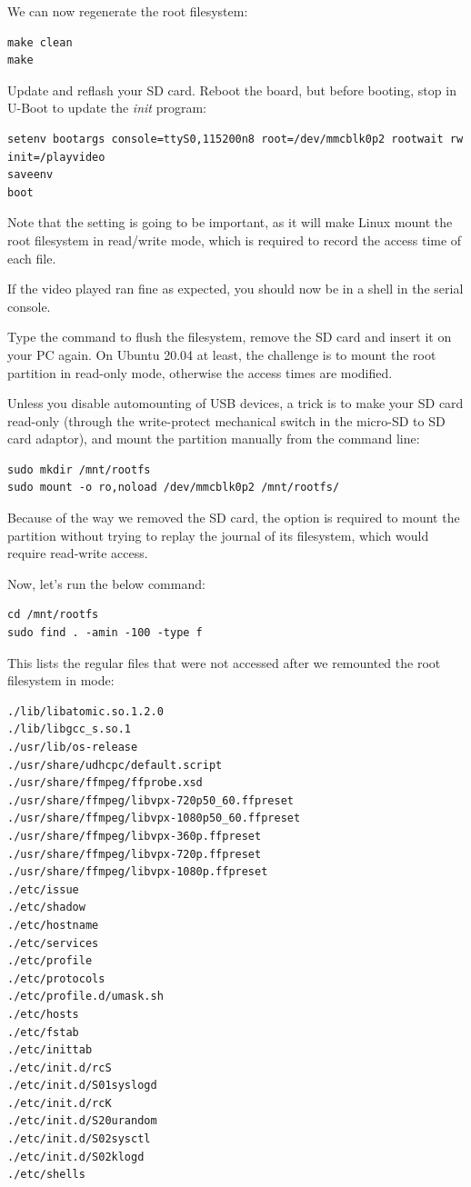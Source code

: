 We can now regenerate the root filesystem:
\begin{verbatim}
make clean
make
\end{verbatim}

Update and reflash your SD card. Reboot the board, but before booting,
stop in U-Boot to update the {\em init} program:

\begin{verbatim}
setenv bootargs console=ttyS0,115200n8 root=/dev/mmcblk0p2 rootwait rw init=/playvideo
saveenv
boot
\end{verbatim}

Note that the  setting is going to be important, as it will
make Linux mount the root filesystem in read/write mode, which is
required to record the access time of each file.

If the video played ran fine as expected, you should now be in a shell
in the serial console.

Type the  command to flush the filesystem, remove the SD card
and insert it on your PC again. On Ubuntu 20.04 at least, the challenge
is to mount the root partition in read-only mode, otherwise the
access times are modified.

Unless you disable automounting of USB devices, a trick is to
make your SD card read-only (through the write-protect mechanical
switch in the micro-SD to SD card adaptor), and mount the partition
manually from the command line:

\begin{verbatim}
sudo mkdir /mnt/rootfs
sudo mount -o ro,noload /dev/mmcblk0p2 /mnt/rootfs/
\end{verbatim}

Because of the way we removed the SD card, the 
option is required to mount the partition without trying to
replay the journal of its filesystem, which would require
read-write access.

Now, let's run the below command:

\begin{verbatim}
cd /mnt/rootfs
sudo find . -amin -100 -type f
\end{verbatim}

This lists the regular files that were not accessed after we remounted
the root filesystem in  mode:

\begin{verbatim}
./lib/libatomic.so.1.2.0
./lib/libgcc_s.so.1
./usr/lib/os-release
./usr/share/udhcpc/default.script
./usr/share/ffmpeg/ffprobe.xsd
./usr/share/ffmpeg/libvpx-720p50_60.ffpreset
./usr/share/ffmpeg/libvpx-1080p50_60.ffpreset
./usr/share/ffmpeg/libvpx-360p.ffpreset
./usr/share/ffmpeg/libvpx-720p.ffpreset
./usr/share/ffmpeg/libvpx-1080p.ffpreset
./etc/issue
./etc/shadow
./etc/hostname
./etc/services
./etc/profile
./etc/protocols
./etc/profile.d/umask.sh
./etc/hosts
./etc/fstab
./etc/inittab
./etc/init.d/rcS
./etc/init.d/S01syslogd
./etc/init.d/rcK
./etc/init.d/S20urandom
./etc/init.d/S02sysctl
./etc/init.d/S02klogd
./etc/shells
\end{verbatim}

